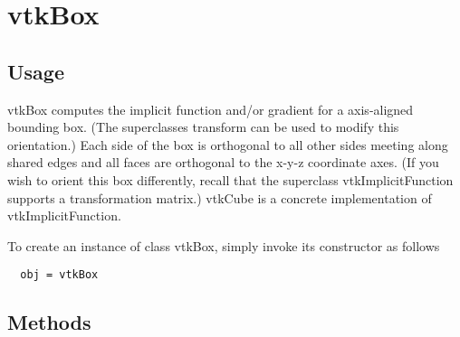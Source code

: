 \section{vtkBox}

\subsection{Usage}

 vtkBox computes the implicit function and/or gradient for a axis-aligned
 bounding box. (The superclasses transform can be used to modify this
 orientation.) Each side of the box is orthogonal to all other sides
 meeting along shared edges and all faces are orthogonal to the x-y-z
 coordinate axes.  (If you wish to orient this box differently, recall that
 the superclass vtkImplicitFunction supports a transformation matrix.)
 vtkCube is a concrete implementation of vtkImplicitFunction.
 

To create an instance of class vtkBox, simply
invoke its constructor as follows
\begin{verbatim}
  obj = vtkBox
\end{verbatim}
\subsection{Methods}

